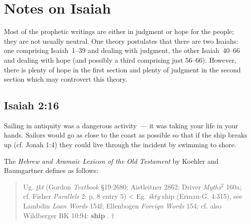 \section{Notes on Isaiah}\label{app:isaiah}\thispagestyle{fancy}
Most of the prophetic writings are either in judgment or hope for the people; they are not usually neutral. One theory postulates that there are two Isaiahs: one comprising Isaiah~1--39 and dealing with judgment, the other Isaiah~40--66 and dealing with hope (and possibly a third comprising just 56--66). However, there is plenty of hope in the first section and plenty of judgment in the second section which may controvert this theory.

\subsection{Isaiah 2:16}\label{app:isa-2-16}
Sailing in antiquity was a dangerous activity~--- it was taking your life in your hands. Sailors would go as close to the coast as possible so that if the ship breaks up (cf. Jonah 1:4) they could live through the incident by swimming to shore.

The \textit{Hebrew and Aramaic Lexicon of the Old Testament} by Koehler and Baumgartner defines  as follows:
\begin{quote}
    Ug. \textit{\uline{t}kt} (Gordon \textit{Textbook} \S19:2680; Aistleitner 2862; Driver \textit{Myths}$^2$ 160a; cf. Fisher \textit{Parallels} 2: p. 8 entry 5) < Eg. \textit{\'skty} ship (Erman-G. 4:315), see Lambdin \textit{Loan Words} 154f; Ellenbogen \textit{Foreign Words} 154; cf. also Wildberger BK 10:94: \textbf{ship} . $\dagger$
\end{quote}


